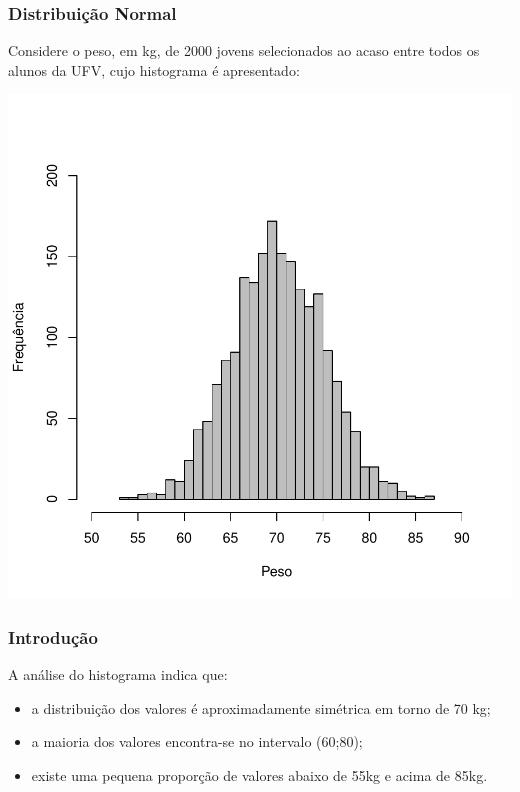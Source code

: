 \documentclass[14pt,aspectratio=1610]{beamer}
\begin{document}
\begin{frame}[fragile]{}
\frametitle{Distribuição Normal}
Considere o peso, em kg, de 2000 jovens selecionados ao acaso entre todos os alunos da UFV, cujo histograma é apresentado:
\vspace{-1cm}
\begin{center}
\includegraphics{Aula14-001}
\end{center}
\end{frame}

\begin{frame}{}
\frametitle{Introdução}
\begin{block}{}
\justifying
A análise do histograma indica que:
\begin{itemize}
\item a distribuição dos valores é aproximadamente simétrica em torno de 70 kg;
\item a maioria dos valores encontra-se no intervalo (60;80);
\item existe uma pequena proporção de valores abaixo de 55kg e acima de 85kg.
\end{itemize}
\end{block}
\end{frame}
\end{document}

